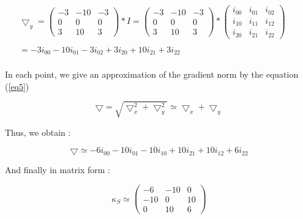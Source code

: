 \documentclass[12pt,a4paper]{article}
\begin{document}
\vspace{1cm}

\begin{equation}\label{eq4}
\begin{matrix}
\bigtriangledown_y = \begin{pmatrix}
-3 & -10 & -3 \\ 
0 & 0 & 0 \\ 
3 & 10 & 3
\end{pmatrix}*I  = \begin{pmatrix}
-3 & -10 & -3 \\ 
0 & 0 & 0 \\ 
3 & 10 & 3
\end{pmatrix}* \begin{pmatrix}
i_{00} & i_{01} & i_{02} \\ 
i_{10} & i_{11} & i_{12}\\ 
i_{20} & i_{21} & i_{22}
\end{pmatrix}  \\ 
& & \\
 =  -3i_{00}-10i_{01}-3i_{02}+3i_{20}+10i_{21}+3i_{22} \\ 
\end{matrix}
\end{equation}
 
\vspace{0.5cm}

In each point, we give an approximation of the gradient norm by the equation (\ref{eq5})

\begin{equation}\label{eq5}
\bigtriangledown = \sqrt{\bigtriangledown_x^2 + \bigtriangledown_y^2 } \simeq \bigtriangledown_x + \bigtriangledown_y
\end{equation}

\vspace{0.5cm}

Thus, we obtain :

\begin{equation}\label{eq6}
\bigtriangledown \simeq -6i_{00}-10i_{01}-10i_{10}+10i_{21}+10i_{12}+6i_{22}
\end{equation}
 
\vspace{0.25cm}
 
And finally in matrix form : 

\begin{equation}\label{eq7}
\kappa_S  \simeq \begin{pmatrix}
-6 & -10 & 0\\ 
-10 & 0 & 10\\ 
 0 & 10 & 6
\end{pmatrix}
\end{equation}
\end{document}
